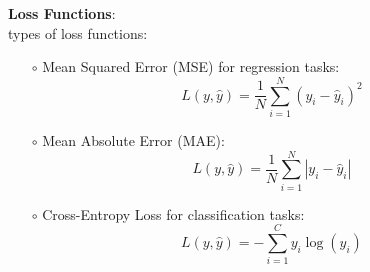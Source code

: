 \documentclass{article}
\newenvironment{cheatformula}[1][כותרת]{
    \begin{minipage}{\linewidth}
    \textbf{#1}: \\
}{
    \end{minipage}\\[0ex]
}
\begin{document}
\begin{cheatformula}[Loss Functions]
types of loss functions:
\begin{itemize}
  \item[$\circ$] Mean Squared Error (MSE) for regression tasks:
  \begin{equation}
    L(y, \hat{y}) = \frac{1}{N} \sum_{i=1}^{N} (y_i - \hat{y}_i)^2
  \end{equation}

  \item[$\circ$] Mean Absolute Error (MAE):
  \begin{equation}
    L(y, \hat{y}) = \frac{1}{N} \sum_{i=1}^{N} |y_i - \hat{y}_i|
  \end{equation}

  \item[$\circ$] Cross-Entropy Loss for classification tasks:
  \begin{equation}
    L(y, \hat{y}) = -\sum_{i=1}^{C} y_i \log(\hat{y}_i)
  \end{equation}  
  
  \end{itemize}
\end{cheatformula}
\end{document}
